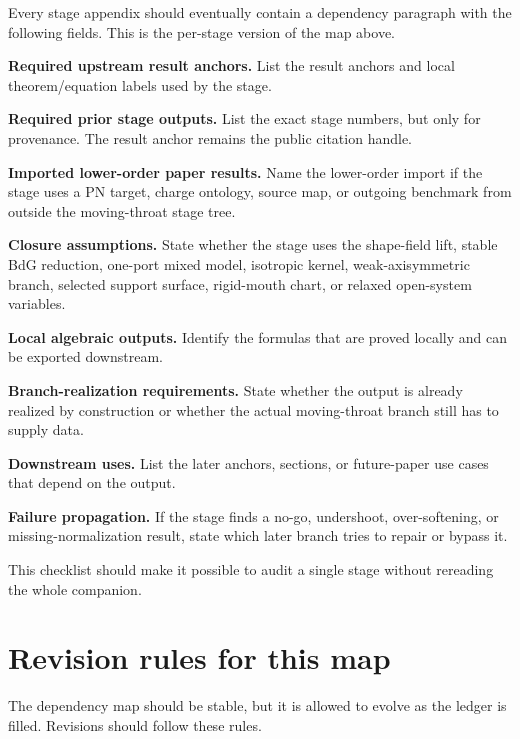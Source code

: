 Every stage appendix should eventually contain a dependency paragraph with the following fields.  This is the per-stage version of the map above.

\begin{verificationchecklist}
  \item \textbf{Required upstream result anchors.}  List the result anchors and local theorem/equation labels used by the stage.
  \item \textbf{Required prior stage outputs.}  List the exact stage numbers, but only for provenance.  The result anchor remains the public citation handle.
  \item \textbf{Imported lower-order paper results.}  Name the lower-order import if the stage uses a PN target, charge ontology, source map, or outgoing benchmark from outside the moving-throat stage tree.
  \item \textbf{Closure assumptions.}  State whether the stage uses the shape-field lift, stable BdG reduction, one-port mixed model, isotropic kernel, weak-axisymmetric branch, selected support surface, rigid-mouth chart, or relaxed open-system variables.
  \item \textbf{Local algebraic outputs.}  Identify the formulas that are proved locally and can be exported downstream.
  \item \textbf{Branch-realization requirements.}  State whether the output is already realized by construction or whether the actual moving-throat branch still has to supply data.
  \item \textbf{Downstream uses.}  List the later anchors, sections, or future-paper use cases that depend on the output.
  \item \textbf{Failure propagation.}  If the stage finds a no-go, undershoot, over-softening, or missing-normalization result, state which later branch tries to repair or bypass it.
\end{verificationchecklist}

This checklist should make it possible to audit a single stage without rereading the whole companion.

\section{Revision rules for this map}
\label{sec:dependency-map-revision-rules}

The dependency map should be stable, but it is allowed to evolve as the ledger is filled.  Revisions should follow these rules.

